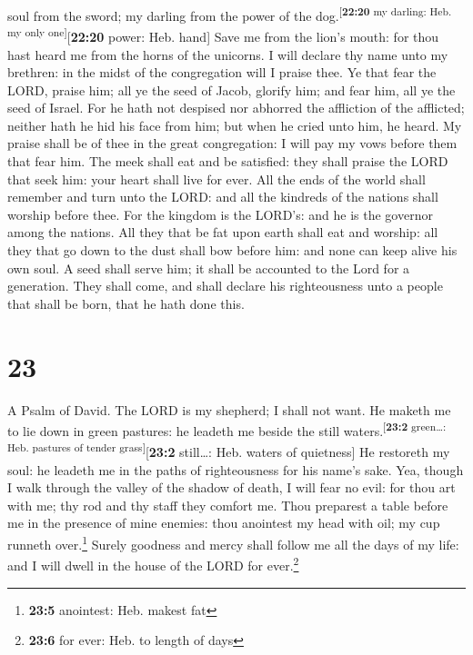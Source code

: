 soul from the sword; my darling from the power of the
dog.\textsuperscript{{[}\textbf{22:20} my darling: Heb. my only
one{]}}{[}\textbf{22:20} power: Heb. hand{]}  Save me
from the lion's mouth: for thou hast heard me from the horns of the
unicorns.  I will declare thy name unto my brethren: in
the midst of the congregation will I praise thee.  Ye
that fear the LORD, praise him; all ye the seed of Jacob, glorify him;
and fear him, all ye the seed of Israel.  For he hath not
despised nor abhorred the affliction of the afflicted; neither hath he
hid his face from him; but when he cried unto him, he heard.
 My praise shall be of thee in the great congregation: I
will pay my vows before them that fear him.  The meek
shall eat and be satisfied: they shall praise the LORD that seek him:
your heart shall live for ever.  All the ends of the
world shall remember and turn unto the LORD: and all the kindreds of the
nations shall worship before thee.  For the kingdom is
the LORD's: and he is the governor among the nations. 
All they that be fat upon earth shall eat and worship: all they that go
down to the dust shall bow before him: and none can keep alive his own
soul.  A seed shall serve him; it shall be accounted to
the Lord for a generation.  They shall come, and shall
declare his righteousness unto a people that shall be born, that he hath
done this.

\hypertarget{section-22}{%
\section{23}\label{section-22}}

A Psalm of David.  The LORD is my shepherd; I shall not
want.  He maketh me to lie down in green pastures: he
leadeth me beside the still waters.\textsuperscript{{[}\textbf{23:2}
green\ldots: Heb. pastures of tender grass{]}}{[}\textbf{23:2}
still\ldots: Heb. waters of quietness{]}  He restoreth my
soul: he leadeth me in the paths of righteousness for his name's sake.
 Yea, though I walk through the valley of the shadow of
death, I will fear no evil: for thou art with me; thy rod and thy staff
they comfort me.  Thou preparest a table before me in the
presence of mine enemies: thou anointest my head with oil; my cup
runneth over.\footnote{\textbf{23:5} anointest: Heb. makest fat}
 Surely goodness and mercy shall follow me all the days of
my life: and I will dwell in the house of the LORD for ever.\footnote{\textbf{23:6}
  for ever: Heb. to length of days}

